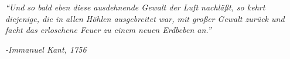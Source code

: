 \clearpage
{}

\begin{center}
\vspace*{11cm}
\textit{``Und so bald eben diese ausdehnende Gewalt der Luft nachl\"aßt, so kehrt diejenige, die in allen H\"ohlen ausgebreitet  war, mit großer Gewalt zur\"uck und facht das erloschene Feuer zu einem neuen Erdbeben an.''}
\end{center}
\par
\hspace*{7cm}
\textit{-Immanuel Kant, 1756\cite{Kant}}
